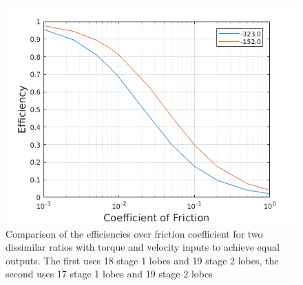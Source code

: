 \begin{figure}[t]
	\centering
	\includegraphics[width=0.75\linewidth]{fig/two_stage_lower_ratio}
   \caption{Comparison of the efficiencies over friction coefficient for two dissimilar ratios with torque and velocity inputs to achieve equal outputs. The first uses 18 stage 1 lobes and 19 stage 2 lobes, the second uses 17 stage 1 lobes and 19 stage 2 lobes}
   \label{fig:two_stage_lower_ratio}
\end{figure}
